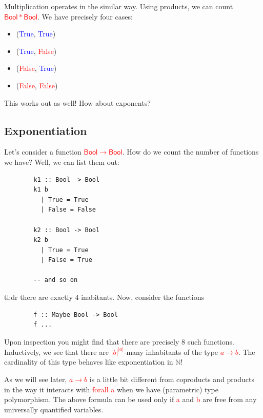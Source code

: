 \documentclass[tikz]{beamer}
\newcommand{\cat}[1]{\bm{ \mathsf{#1} }}
\newcommand{\red}[1]{\textcolor{red}{#1}}
\newcommand{\mred}[1]{\textcolor{red}{$#1$}}
\newcommand{\blue}[1]{\textcolor{blue}{#1}}
\theoremstyle{definition}
\begin{document}
\frame
{

	Multiplication operates in the similar way. Using products, we can count \mred{\cat{Bool} * \cat{Bool}}. We have precisely four cases: 
	
	\begin{itemize}	
		\item (\blue{True}, \blue{True})
		\item(\blue{True}, \red{False})
		\item (\red{False}, \blue{True})
		\item (\red{False}, \red{False}) 
	\end{itemize}
}

\frame
{
	This works out as well! How about exponents?
}

\subsection{Exponentiation}

\begin{frame}[fragile]
	Let's consider a function \mred{\cat{Bool} \to \cat{Bool}}. How do we count the number of functions we have? Well, we can list them out: 
	
	\begin{verbatim}
		k1 :: Bool -> Bool
		k1 b 
		  | True = True
		  | False = False 
		
		k2 :: Bool -> Bool 
		k2 b 
		  | True = True
		  | False = True 
		  		
		-- and so on	
	\end{verbatim}
	
\end{frame}

\begin{frame}[fragile]

	tl;dr there are exactly 4 inabitants. Now, consider the functions
	
	\begin{verbatim}
		f :: Maybe Bool -> Bool
		f ...
	\end{verbatim}
\end{frame}

\frame
{
	Upon inspection you might find that there are precisely 8 such functions. Inductively, we see that there are \mred{|b|^{|a|}}-many inhabitants of the type \mred{a \to b}. The cardinality of this type behaves like exponentiation in $\mathbb{N}$!
}

\frame
{

As we will see later, \mred{a \to b} is a little bit different from coproducts and products in the way it interacts with \red{forall a} when we have (parametric) type polymorphism. The above formula can be used only if \red{a} and \red{b} are free from any universally quantified variables.

}
\end{document}
